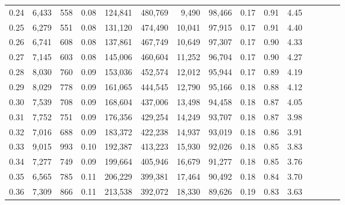 \begin{tabular}{rrrcrrrrrrrrrrr}
0.24 &   6,433 &    558 &                                       0.08 &  124,841 &  480,769 &    9,490 &   98,466 &  0.17 &  0.91 &                         4.45 \\
0.25 &   6,279 &    551 &                                       0.08 &  131,120 &  474,490 &   10,041 &   97,915 &  0.17 &  0.91 &                         4.40 \\
0.26 &   6,741 &    608 &                                       0.08 &  137,861 &  467,749 &   10,649 &   97,307 &  0.17 &  0.90 &                         4.33 \\
0.27 &   7,145 &    603 &                                       0.08 &  145,006 &  460,604 &   11,252 &   96,704 &  0.17 &  0.90 &                         4.27 \\
0.28 &   8,030 &    760 &                                       0.09 &  153,036 &  452,574 &   12,012 &   95,944 &  0.17 &  0.89 &                         4.19 \\
0.29 &   8,029 &    778 &                                       0.09 &  161,065 &  444,545 &   12,790 &   95,166 &  0.18 &  0.88 &                         4.12 \\
0.30 &   7,539 &    708 &                                       0.09 &  168,604 &  437,006 &   13,498 &   94,458 &  0.18 &  0.87 &                         4.05 \\
0.31 &   7,752 &    751 &                                       0.09 &  176,356 &  429,254 &   14,249 &   93,707 &  0.18 &  0.87 &                         3.98 \\
0.32 &   7,016 &    688 &                                       0.09 &  183,372 &  422,238 &   14,937 &   93,019 &  0.18 &  0.86 &                         3.91 \\
0.33 &   9,015 &    993 &                                       0.10 &  192,387 &  413,223 &   15,930 &   92,026 &  0.18 &  0.85 &                         3.83 \\
0.34 &   7,277 &    749 &                                       0.09 &  199,664 &  405,946 &   16,679 &   91,277 &  0.18 &  0.85 &                         3.76 \\
0.35 &   6,565 &    785 &                                       0.11 &  206,229 &  399,381 &   17,464 &   90,492 &  0.18 &  0.84 &                         3.70 \\
0.36 &   7,309 &    866 &                                       0.11 &  213,538 &  392,072 &   18,330 &   89,626 &  0.19 &  0.83 &                         3.63 \\

\end{tabular}
